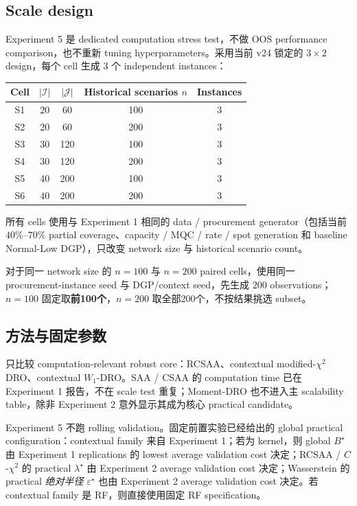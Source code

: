 \documentclass[11pt,a4paper]{ctexart}
\newcommand{\I}{\mathcal I}
\newcommand{\J}{\mathcal J}
\begin{document}
\subsection{Scale design}

Experiment 5 是 dedicated computation stress test，不做 OOS performance comparison，也不重新 tuning hyperparameters。采用当前 v24 锁定的 $3\times2$ design，每个 cell 生成 $3$ 个 independent instances：
\begin{center}
\small
\begin{tabular}{ccccc}
\toprule
Cell & $|\I|$ & $|\J|$ & Historical scenarios $n$ & Instances\\
\midrule
S1 & 20 & 60  & 100 & 3\\
S2 & 20 & 60  & 200 & 3\\
S3 & 30 & 120 & 100 & 3\\
S4 & 30 & 120 & 200 & 3\\
S5 & 40 & 200 & 100 & 3\\
S6 & 40 & 200 & 200 & 3\\
\bottomrule
\end{tabular}
\end{center}
所有 cells 使用与 Experiment 1 相同的 data / procurement generator（包括当前 $40\%$--$70\%$ partial coverage、capacity / MQC / rate / spot generation 和 baseline Normal-Low DGP），只改变 network size 与 historical scenario count。

对于同一 network size 的 $n=100$ 与 $n=200$ paired cells，使用同一 procurement-instance seed 与 DGP/context seed，先生成 $200$ observations；$n=100$ 固定取\textbf{前100个}，$n=200$ 取全部200个，不按结果挑选 subset。

\subsection{方法与固定参数}

只比较 computation-relevant robust core：RCSAA、contextual modified-$\chi^2$ DRO、contextual $W_1$-DRO。SAA / CSAA 的 computation time 已在 Experiment 1 报告，不在 scale test 重复；Moment-DRO 也不进入主 scalability table，除非 Experiment 2 意外显示其成为核心 practical candidate。

Experiment 5 不跑 rolling validation。固定前置实验已经给出的 global practical configuration：contextual family 来自 Experiment 1；若为 kernel，则 global $B^\star$ 由 Experiment 1 replications 的 lowest average validation cost 决定；RCSAA / $C$-$\chi^2$ 的 practical $\lambda^\star$ 由 Experiment 2 average validation cost 决定；Wasserstein 的 practical \emph{绝对半径} $\varepsilon^\star$ 也由 Experiment 2 average validation cost 决定。若 contextual family 是 RF，则直接使用固定 RF specification。
\end{document}

